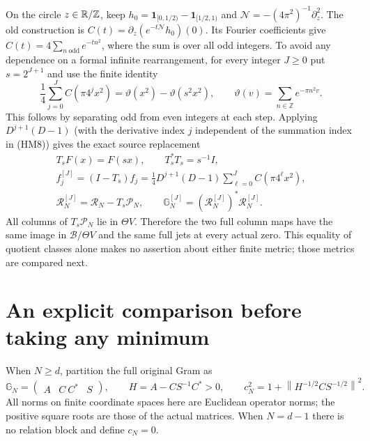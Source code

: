 \documentclass[11pt]{article}
\newcommand{\B}{\mathscr B}\newcommand{\M}{\mathcal M}
\newcommand{\norm}[1]{\left\lVert#1\right\rVert}
\begin{document}
On the circle $z\in\mathbb R/\mathbb Z$, keep
$h_0=\mathbf1_{[0,1/2)}-\mathbf1_{[1/2,1)}$ and
$\mathcal N=-(4\pi^2)^{-1}\partial_z^2$. The old construction
\cite{oldcircle} is $C(t)=\partial_z(e^{-t\mathcal N}h_0)(0)$.
Its Fourier coefficients give $C(t)=4\sum_{n\ {\mathrm{odd}}}e^{-tn^2}$,
where the sum is over all odd integers. To avoid any dependence on a
formal infinite rearrangement, for every integer $J\ge0$ put
$s=2^{J+1}$ and use the finite identity
\begin{equation}\tag{HM8}
 \frac14\sum_{j=0}^J C(\pi4^jx^2)
  =\vartheta(x^2)-\vartheta(s^2x^2),\qquad
 \vartheta(v)=\sum_{n\in\mathbb Z}e^{-\pi n^2v}.
\end{equation}
This follows by separating odd from even integers at each step.
Applying $D^{j+1}(D-1)$ (with the derivative index $j$ independent of
the summation index in (HM8)) gives the exact source replacement
\begin{equation}\tag{HM9}
 \begin{gathered}
 T_sF(x)=F(sx),\qquad T_s^*T_s=s^{-1}I,\\
 f_j^{[J]}=(I-T_s)f_j
   =\frac14D^{j+1}(D-1)\sum_{\ell=0}^J C(\pi4^\ell x^2),\\
 \mathcal R_N^{[J]}=\mathcal R_N-T_s\mathcal P_N,
 \qquad \mathbb G_N^{[J]}=(\mathcal R_N^{[J]})^*\mathcal R_N^{[J]}.
 \end{gathered}
\end{equation}
All columns of $T_s\mathcal P_N$ lie in $\Theta V$. Therefore the
two full column maps have the same image in $\B/\Theta V$ and the
same full jets at every actual zero. This equality of quotient classes
alone makes no assertion about either finite metric; those metrics
are compared next.

\section{An explicit comparison before taking any minimum}
When $N\ge d$, partition the full original Gram as
\begin{equation}\tag{HM10}
 \mathbb G_N=\begin{pmatrix}A&C\ C^*&S\end{pmatrix},\qquad
 H=A-CS^{-1}C^*>0,
 \qquad
 c_N^2=1+\norm{H^{-1/2}CS^{-1/2}}^2.
\end{equation}
All norms on finite coordinate spaces here are Euclidean operator norms;
the positive square roots are those of the actual matrices. When $N=d-1$
there is no relation block and define $c_N=0$.
\end{document}
